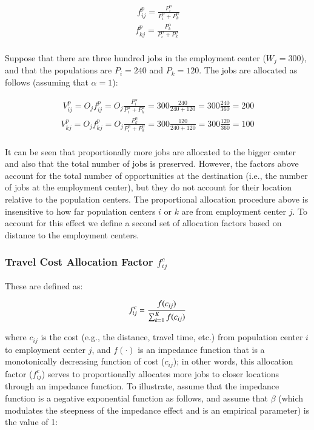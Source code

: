 \documentclass[]{elsarticle} %
\begin{document}
\[
\begin{array}{l}\
f^p_{ij} = \frac{P_i ^\alpha}{P_i^\alpha + P_k^\alpha}\\
f^p_{kj} = \frac{P_k^\alpha}{P_i^\alpha + P_k^\alpha}\\
\end{array}
\]

Suppose that there are three hundred jobs in the employment center
(\(W_j = 300\)), and that the populations are \(P_i=240\) and
\(P_k=120\). The jobs are allocated as follows (assuming that
\(\alpha=1\)):

\[
\begin{array}{l}\
V^p_{ij} = O_jf^p_{ij} = O_j\frac{P_i^\alpha}{P_i^\alpha + P_k^\alpha} = 300\frac{240}{240 + 120} = 300\frac{240}{360} = 200\\
V^p_{kj} = O_jf^p_{kj} = O_j\frac{P_k^\alpha}{P_i^\alpha + P_k^\alpha} = 300\frac{120}{240 + 120} = 300\frac{120}{360} = 100 \\
\end{array}
\]

It can be seen that proportionally more jobs are allocated to the bigger
center and also that the total number of jobs is preserved. However, the
factors above account for the total number of opportunities at the
destination (i.e., the number of jobs at the employment center), but
they do not account for their location relative to the population
centers. The proportional allocation procedure above is insensitive to
how far population centers \(i\) or \(k\) are from employment center
\(j\). To account for this effect we define a second set of allocation
factors based on distance to the employment centers.

\hypertarget{travel-cost-allocation-factor-fc_ij}{%
\subsubsection{\texorpdfstring{Travel Cost Allocation Factor
\(f^c_{ij}\)}{Travel Cost Allocation Factor f\^{}c\_\{ij\}}}\label{travel-cost-allocation-factor-fc_ij}}

These are defined as:

\[
f^c_{ij} = \frac{f(c_{ij})}{\sum_{k=1}^K f(c_{ij})}\\
\]

\noindent where \(c_{ij}\) is the cost (e.g., the distance, travel time,
etc.) from population center \(i\) to employment center \(j\), and
\(f(\cdot)\) is an impedance function that is a monotonically decreasing
function of cost (\(c_{ij}\)); in other words, this allocation factor
(\(f^c_{ij}\)) serves to proportionally allocates more jobs to closer
locations through an impedance function. To illustrate, assume that the
impedance function is a negative exponential function as follows, and
assume that \(\beta\) (which modulates the steepness of the impedance
effect and is an empirical parameter) is the value of 1:
\end{document}
